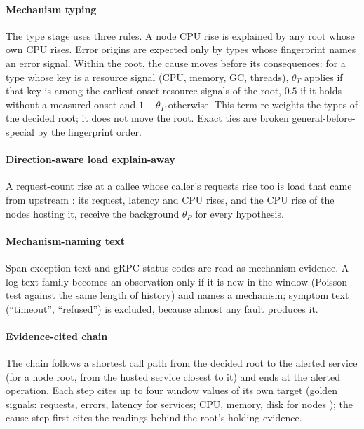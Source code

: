 \paragraph{ Mechanism typing}
The type stage uses three rules. A node CPU rise is explained by any root whose own CPU rises. Error origins are expected only by
types whose fingerprint names an error signal. Within the root, the cause moves before its consequences: for a type whose key is a
resource signal (CPU, memory, GC, threads), $\theta_T$ applies if that key is among the earliest-onset resource signals of the root,
$0.5$ if it holds without a measured onset and $1-\theta_T$ otherwise. This term re-weights the types of the decided root; it
does not move the root. Exact ties are broken general-before-special by the fingerprint order.

\paragraph{ Direction-aware load explain-away}
A request-count rise at a callee whose caller's requests rise too is load that came from upstream \citep{liu2021microhecl}: its
request, latency and CPU rises, and the CPU rise of the nodes hosting it, receive the background $\theta_P$ for every hypothesis.

\paragraph{ Mechanism-naming text}
Span exception text and gRPC status codes are read as mechanism evidence. A log text family becomes an observation only if it is
new in the window (Poisson test against the same length of history) and names a mechanism; symptom text (``timeout'',
``refused'') is excluded, because almost any fault produces it.

\paragraph{ Evidence-cited chain}
The chain follows a shortest call path from the decided root to the alerted service (for a node root, from the hosted service
closest to it) and ends at the alerted operation. Each step cites up to four window values of its own target (golden signals:
requests, errors, latency for services; CPU, memory, disk for nodes \citep{beyer2016sre}); the cause step first cites the readings
behind the root's holding evidence.

